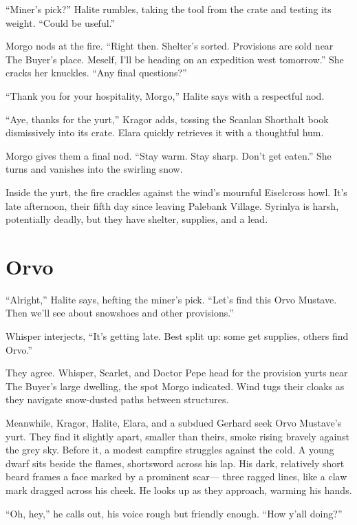\documentclass[
  letterpaper,12pt,twoside,twocolumn,openany,
  nodeprecatedcode,bg=full]{dndbook}
\begin{document}
``Miner's pick?'' Halite rumbles, taking the tool from the crate and
testing its weight. ``Could be useful.''

Morgo nods at the fire. ``Right then. Shelter's sorted. Provisions are
sold near The Buyer's place. Meself, I'll be heading on an expedition
west tomorrow.'' She cracks her knuckles. ``Any final questions?''

``Thank you for your hospitality, Morgo,'' Halite says with a respectful
nod.

``Aye, thanks for the yurt,'' Kragor adds, tossing the Scanlan Shorthalt
book dismissively into its crate. Elara quickly retrieves it with a
thoughtful hum.

Morgo gives them a final nod. ``Stay warm. Stay sharp. Don't get
eaten.'' She turns and vanishes into the swirling snow.

Inside the yurt, the fire crackles against the wind's mournful
Eiselcross howl. It's late afternoon, their fifth day since leaving
Palebank Village. Syrinlya is harsh, potentially deadly, but they have
shelter, supplies, and a lead.

\section{Orvo}\label{orvo}

``Alright,'' Halite says, hefting the miner's pick. ``Let's find this
Orvo Mustave. Then we'll see about snowshoes and other provisions.''

Whisper interjects, ``It's getting late. Best split up: some get
supplies, others find Orvo.''

They agree. Whisper, Scarlet, and Doctor Pepe head for the provision
yurts near The Buyer's large dwelling, the spot Morgo indicated. Wind
tugs their cloaks as they navigate snow-dusted paths between structures.

Meanwhile, Kragor, Halite, Elara, and a subdued Gerhard seek Orvo
Mustave's yurt. They find it slightly apart, smaller than theirs, smoke
rising bravely against the grey sky. Before it, a modest campfire
struggles against the cold. A young dwarf sits beside the flames,
shortsword across his lap. His dark, relatively short beard frames a
face marked by a prominent scar--- three ragged lines, like a claw mark
dragged across his cheek. He looks up as they approach, warming his
hands.

``Oh, hey,'' he calls out, his voice rough but friendly enough. ``How
y'all doing?''
\end{document}
